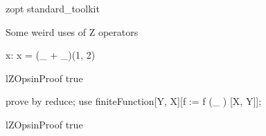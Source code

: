 \begin{zsection}
   \SECTION zopt \parents standard\_toolkit
\end{zsection}

Some weird uses of Z operators

\begin{axdef}
   x: \nat
\where
   x = (\_ + \_)(1, 2)
\end{axdef}


\begin{theorem}{lZOpsinProof}
   true
\end{theorem}

\begin{zproof}[lZOpsinProof]
  prove by reduce;
  use finiteFunction[Y, X][f := f (\_ \inv) [X, Y]];
\end{zproof}

\begin{theorem}{lZOpsinProof}
   true
\end{theorem}
